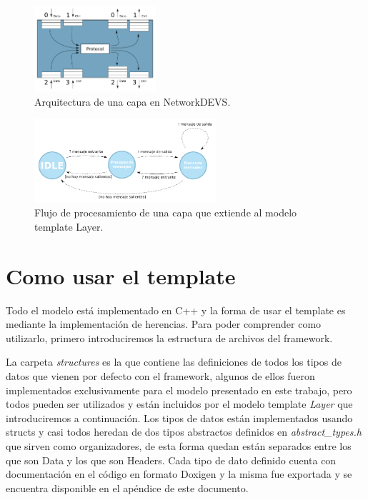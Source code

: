 \documentclass[10pt,a4paper]{article}
\begin{document}
\begin{figure}[htbp]
    \centering
    \includegraphics[width = 0.4\textwidth]{img/png/layer_architecture.png}
    \caption{Arquitectura de una capa en NetworkDEVS.}
    \label{figure:layer general architecture}
\end{figure}

\begin{figure}[htbp]
    \centering
    \includegraphics[width = 0.6\textwidth]{img/png/processing_flow.png}
    \caption{Flujo de procesamiento de una capa que extiende al modelo template Layer.}
    \label{figure:processing flow}
\end{figure}

\section{Como usar el template}

Todo el modelo está implementado en C++ y la forma de usar el template es mediante la implementación de herencias. Para poder comprender como utilizarlo, primero introduciremos la estructura de archivos del framework. \\


\medskip

La carpeta \textit{structures} es la que contiene las definiciones de todos los tipos de datos que vienen por defecto con el framework, algunos de ellos fueron implementados exclusivamente para el modelo presentado en este trabajo, pero todos pueden ser utilizados y están incluidos por el modelo template \textit{Layer} que introduciremos a continuación. Los tipos de datos están implementados usando structs y casi todos heredan de dos tipos abstractos definidos en \textit{abstract\_types.h} que sirven como organizadores, de esta forma quedan están separados entre los que son Data y los que son Headers. Cada tipo de dato definido cuenta con documentación en el código en formato Doxigen y la misma fue exportada y se encuentra disponible en el apéndice de este documento. \\
\end{document}

